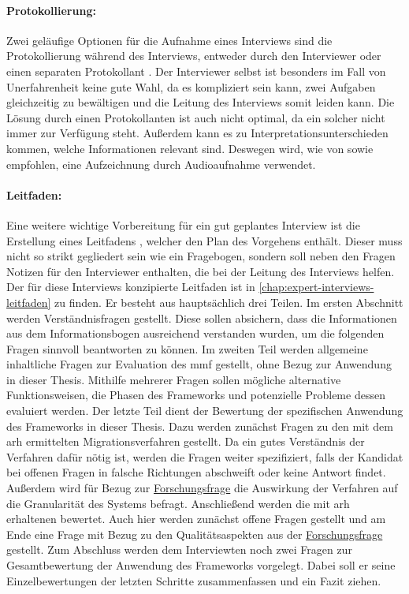 \paragraph{Protokollierung:} Zwei geläufige Optionen für die Aufnahme eines Interviews sind die Pro\-to\-kol\-lie\-rung während des Interviews, entweder durch den Interviewer oder einen separaten Protokollant \cite{seaman2008qualitative,Runeson2009}.
Der Interviewer selbst ist besonders im Fall von Unerfahrenheit keine gute Wahl, da es kompliziert sein kann, zwei Aufgaben gleichzeitig zu bewältigen und die Leitung des Interviews somit leiden kann.
Die Lösung durch einen Protokollanten ist auch nicht optimal, da ein solcher nicht immer zur Verfügung steht.
Außerdem kann es zu Interpretationsunterschieden kommen, welche Informationen relevant sind.
Deswegen wird, wie von  sowie  empfohlen, eine Aufzeichnung durch Audioaufnahme verwendet.

\paragraph{Leitfaden:} Eine weitere wichtige Vorbereitung für ein gut geplantes Interview ist die Erstellung eines Leitfadens \cite{seaman2008qualitative,hove-anda-2005}, welcher den Plan des Vorgehens enthält.
Dieser muss nicht so strikt gegliedert sein wie ein Fragebogen, sondern soll neben den Fragen Notizen für den Interviewer enthalten, die bei der Leitung des Interviews helfen.
Der für diese Interviews konzipierte Leitfaden ist in \cref{chap:expert-interviews-leitfaden} zu finden.
Er besteht aus hauptsächlich drei Teilen.
Im ersten Abschnitt werden Verständnisfragen gestellt.
Diese sollen absichern, dass die Informationen aus dem Informationsbogen ausreichend verstanden wurden, um die folgenden Fragen sinnvoll beantworten zu können.
Im zweiten Teil werden allgemeine inhaltliche Fragen zur Evaluation des \gls{mmf} gestellt, ohne Bezug zur Anwendung in dieser Thesis.
Mithilfe mehrerer Fragen sollen mögliche alternative Funktionsweisen, die Phasen des Frameworks und potenzielle Probleme dessen evaluiert werden.
Der letzte Teil dient der Bewertung der spezifischen Anwendung des Frameworks in dieser Thesis.
Dazu werden zunächst Fragen zu den mit dem \gls{arh} ermittelten Migrationsverfahren gestellt.
Da ein gutes Verständnis der Verfahren dafür nötig ist, werden die Fragen weiter spezifiziert, falls der Kandidat bei offenen Fragen in falsche Richtungen abschweift oder keine Antwort findet.
Außerdem wird für Bezug zur \hyperref[forschungsfrage:1]{Forschungsfrage} die Auswirkung der Verfahren auf die Granularität des Systems befragt.
Anschließend werden die mit \gls{arh} erhaltenen \bpp bewertet.
Auch hier werden zunächst offene Fragen gestellt und am Ende eine Frage mit Bezug zu den Qualitätsaspekten aus der \hyperref[forschungsfrage:1]{Forschungsfrage} gestellt.
Zum Abschluss werden dem Interviewten noch zwei Fragen zur Gesamtbewertung der Anwendung des Frameworks vorgelegt.
Dabei soll er seine Einzelbewertungen der letzten Schritte zusammenfassen und ein Fazit ziehen.

